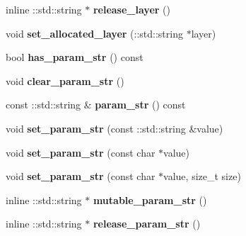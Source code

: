 \begin{DoxyCompactItemize}
inline \+::std\+::string $\ast$ {\bfseries release\+\_\+layer} ()
\item 
\mbox{\label{classcaffe_1_1_python_parameter_adb2f97905a6fa2bdc2eda042da67bec8}} 
void {\bfseries set\+\_\+allocated\+\_\+layer} (\+::std\+::string $\ast$layer)
\item 
\mbox{\label{classcaffe_1_1_python_parameter_aabf39ee2ee12f2f03cc5daf71952f8c6}} 
bool {\bfseries has\+\_\+param\+\_\+str} () const
\item 
\mbox{\label{classcaffe_1_1_python_parameter_a6c679b0b9c8c278422b8dd6dd9ee3856}} 
void {\bfseries clear\+\_\+param\+\_\+str} ()
\item 
\mbox{\label{classcaffe_1_1_python_parameter_adfa244a3c0637af84387e8b5c3526800}} 
const \+::std\+::string \& {\bfseries param\+\_\+str} () const
\item 
\mbox{\label{classcaffe_1_1_python_parameter_a8e63697964518f4e45d8e49cf34854ac}} 
void {\bfseries set\+\_\+param\+\_\+str} (const \+::std\+::string \&value)
\item 
\mbox{\label{classcaffe_1_1_python_parameter_a8b90795bc1b8dffd61e116faa1697b93}} 
void {\bfseries set\+\_\+param\+\_\+str} (const char $\ast$value)
\item 
\mbox{\label{classcaffe_1_1_python_parameter_a6844e8e3b4ecf9908f91b8f0386ff499}} 
void {\bfseries set\+\_\+param\+\_\+str} (const char $\ast$value, size\+\_\+t size)
\item 
\mbox{\label{classcaffe_1_1_python_parameter_a606917f68912cf6a7be69d02ab2fed6b}} 
inline \+::std\+::string $\ast$ {\bfseries mutable\+\_\+param\+\_\+str} ()
\item 
\mbox{\label{classcaffe_1_1_python_parameter_ac5654c41874ba47b65dfc16997a1369b}} 
inline \+::std\+::string $\ast$ {\bfseries release\+\_\+param\+\_\+str} ()
\item 
\mbox{\label{classcaffe_1_1_python_parameter_a6862bddbb70ba2b5db1c672400219802}} 

\end{DoxyCompactItemize}
